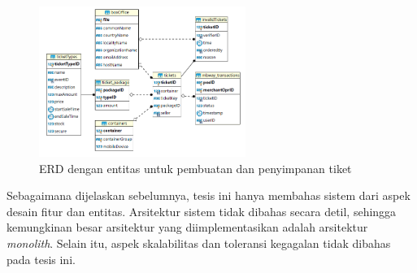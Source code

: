 \begin{figure}[htbp]
    \centering
    \includegraphics[width=0.6\textwidth]{resources/chapter-2/er-ticket-storage.png}
    \caption{ERD dengan entitas untuk pembuatan dan penyimpanan tiket \parencite{backendForTicketing}}
    \label{fig:ticket-storage}
\end{figure}

Sebagaimana dijelaskan sebelumnya, tesis ini hanya membahas sistem dari aspek desain fitur dan entitas. Arsitektur sistem tidak dibahas secara detil, sehingga kemungkinan besar arsitektur yang diimplementasikan adalah arsitektur \textit{monolith}. Selain itu, aspek skalabilitas dan toleransi kegagalan tidak dibahas pada tesis ini.